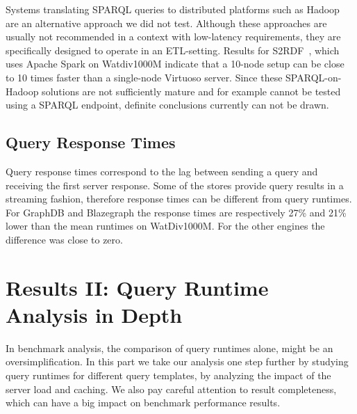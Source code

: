 \documentclass[twocolumn]{bmcart}%
\begin{document}
Systems translating SPARQL queries to distributed platforms such as Hadoop~\cite{cure2015evaluation, graux2016multi} are an alternative approach we did not test. Although these approaches are usually not recommended in a context with low-latency requirements, they are specifically designed to operate in an ETL-setting. 
Results for S2RDF~\cite{Schatzle:2016:SRQ:2977797.2977806}, which uses Apache Spark on Watdiv1000M indicate that a 10-node setup can be close to 10 times faster than a single-node Virtuoso server. Since these SPARQL-on-Hadoop solutions are not sufficiently mature and for example cannot be tested using a SPARQL endpoint, definite conclusions currently can not be drawn. 

\subsection{Query Response Times}
Query response times correspond to the lag between sending a query and receiving the first server response. Some of the stores provide query results in a streaming fashion, 
therefore response times can be different from query runtimes.
For GraphDB and Blazegraph the response times are respectively 27\% and 21\% lower than the mean runtimes on WatDiv1000M. For the other engines the difference was close to zero.



\section{Results II: Query Runtime Analysis in Depth}
\label{sec:runtimefactors}
%


In benchmark analysis, the comparison of query runtimes alone, might be an oversimplification. 
In this part we take our analysis one step further by studying query runtimes for different query templates, by analyzing the impact of the server load and caching. We also pay careful attention to result completeness, which can have a big impact on benchmark performance results.
\end{document}
